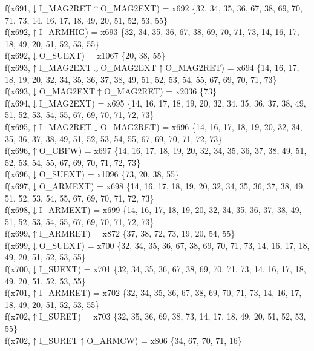 f(x691,$\downarrow$I\_MAG2RET$\uparrow$O\_MAG2EXT) = x692 \{32, 34, 35, 36, 67, 38, 69, 70, 71, 73, 14, 16, 17, 18, 49, 20, 51, 52, 53, 55\} \\  
f(x692,$\uparrow$I\_ARMHIG) = x693 \{32, 34, 35, 36, 67, 38, 69, 70, 71, 73, 14, 16, 17, 18, 49, 20, 51, 52, 53, 55\} \\  
f(x692,$\downarrow$O\_SUEXT) = x1067 \{20, 38, 55\} \\  
f(x693,$\uparrow$I\_MAG2EXT$\downarrow$O\_MAG2EXT$\uparrow$O\_MAG2RET) = x694 \{14, 16, 17, 18, 19, 20, 32, 34, 35, 36, 37, 38, 49, 51, 52, 53, 54, 55, 67, 69, 70, 71, 73\} \\  
f(x693,$\downarrow$O\_MAG2EXT$\uparrow$O\_MAG2RET) = x2036 \{73\} \\  
f(x694,$\downarrow$I\_MAG2EXT) = x695 \{14, 16, 17, 18, 19, 20, 32, 34, 35, 36, 37, 38, 49, 51, 52, 53, 54, 55, 67, 69, 70, 71, 72, 73\} \\  
f(x695,$\uparrow$I\_MAG2RET$\downarrow$O\_MAG2RET) = x696 \{14, 16, 17, 18, 19, 20, 32, 34, 35, 36, 37, 38, 49, 51, 52, 53, 54, 55, 67, 69, 70, 71, 72, 73\} \\  
f(x696,$\uparrow$O\_CBFW) = x697 \{14, 16, 17, 18, 19, 20, 32, 34, 35, 36, 37, 38, 49, 51, 52, 53, 54, 55, 67, 69, 70, 71, 72, 73\} \\  
f(x696,$\downarrow$O\_SUEXT) = x1096 \{73, 20, 38, 55\} \\  
f(x697,$\downarrow$O\_ARMEXT) = x698 \{14, 16, 17, 18, 19, 20, 32, 34, 35, 36, 37, 38, 49, 51, 52, 53, 54, 55, 67, 69, 70, 71, 72, 73\} \\  
f(x698,$\downarrow$I\_ARMEXT) = x699 \{14, 16, 17, 18, 19, 20, 32, 34, 35, 36, 37, 38, 49, 51, 52, 53, 54, 55, 67, 69, 70, 71, 72, 73\} \\  
f(x699,$\uparrow$I\_ARMRET) = x872 \{37, 38, 72, 73, 19, 20, 54, 55\} \\  
f(x699,$\downarrow$O\_SUEXT) = x700 \{32, 34, 35, 36, 67, 38, 69, 70, 71, 73, 14, 16, 17, 18, 49, 20, 51, 52, 53, 55\} \\  
f(x700,$\downarrow$I\_SUEXT) = x701 \{32, 34, 35, 36, 67, 38, 69, 70, 71, 73, 14, 16, 17, 18, 49, 20, 51, 52, 53, 55\} \\  
f(x701,$\uparrow$I\_ARMRET) = x702 \{32, 34, 35, 36, 67, 38, 69, 70, 71, 73, 14, 16, 17, 18, 49, 20, 51, 52, 53, 55\} \\  
f(x702,$\uparrow$I\_SURET) = x703 \{32, 35, 36, 69, 38, 73, 14, 17, 18, 49, 20, 51, 52, 53, 55\} \\  
f(x702,$\uparrow$I\_SURET$\uparrow$O\_ARMCW) = x806 \{34, 67, 70, 71, 16\} \\  
